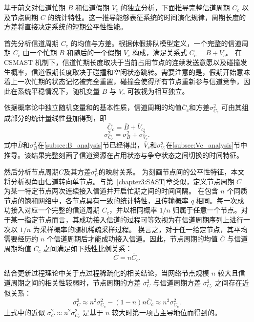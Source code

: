 基于前文对信道忙期 $B$ 和信道假期 $V_c$ 的独立分析，下面推导完整信道周期 $C_c$ 以及节点周期 $C$ 的统计特性。这一推导能够表征系统的时间演化规律，周期长度的方差将直接决定系统的短期公平性性能。

首先分析信道周期 $C_c$ 的均值与方差。根据休假排队模型定义，一个完整的信道周期 $C_c$ 由一个忙期 $B$ 和随后的一个假期 $V_c$ 构成，满足关系式 $C_c = B + V_c$。
在 CSMAST 机制下，信道忙期长度取决于当前占用节点的连续发送意愿以及碰撞发生概率，信道假期长度取决于碰撞和空闲状态跳转。需要注意的是，假期开始意味着上一次忙期的状态记忆被完全重置，碰撞会使得所有节点重新参与信道竞争，因此在系统平稳情况下，随机变量 $B$ 与 $V_c$ 可被视为相互独立。

依据概率论中独立随机变量和的基本性质，信道周期的均值$\overline{C}_c$和方差$\sigma^2_{C_c}$ 可由其组成部分的统计量线性叠加得到，即
\begin{equation}
	\overline{C}_c = \overline{B} + \overline{V}_c,
\end{equation}
\begin{equation}
	\sigma^2_{C_c} = \sigma^2_B + \sigma^2_{V_c}.
\end{equation}
式中$\overline{B}$和$\sigma^2_B$在\ref{subsec:B_analysis}节已经得出，$\overline{V}_c$和$\sigma^2_{V_c}$在\ref{subsec:Vc_analysis}节中推导。该结果完整刻画了信道资源在占用状态与争夺状态之间切换的时间特征。

然后分析节点周期$C$及其方差$\sigma^2_C$的映射关系。
为刻画节点间的公平性特征，本文将分析视角由信道转向单节点。与第~\ref{chapter3:SAST}章类似，定义节点周期 $C$ 为某一特定节点两次连续接入信道并开启忙期之间的时间间隔。
在包含 $n$ 个同质节点的饱和网络中，各节点具有一致的统计特性，且传输概率 $q$ 相同。每一次成功接入对应一个完整的信道周期 $C_c$，并以相同概率 $1/n$ 归属于任意一个节点。对于某一指定节点而言，其成功接入信道的过程可等效视为在信道周期序列上进行一次以 $1/n$ 为采样概率的随机稀疏采样过程。
换言之，对于任一给定节点，其平均需要经历约 $n$ 个信道周期后才能成功接入信道。因此，节点周期的均值 $\overline{C}$ 与信道周期均值 $\overline{C}_c$ 之间满足如下线性比例关系：
\begin{equation}
	\overline{C} = n \overline{C}_c.
\end{equation}

结合更新过程理论中关于点过程稀疏化的相关结论，当网络节点规模 $n$ 较大且信道周期之间的相关性较弱时，节点周期的方差 $\sigma^2_C$ 与信道周期方差 $\sigma^2_{C_c}$ 之间存在近似关系：
\begin{equation}
	\label{eq:node_cycle_variance}
	\sigma^2_C \approx n^2 \sigma^2_{C_c} - (1 - n)n\overline{C}_c \approx n^2 \sigma^2_{C_c}.
\end{equation}
上式中的近似 $\sigma^2_C \approx n^2 \sigma^2_{C_c}$ 是基于 $n$ 较大时第一项占主导地位而得到的。

